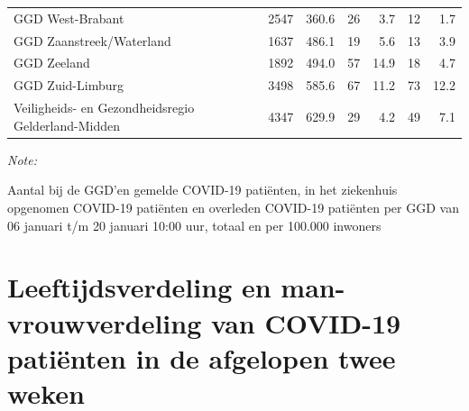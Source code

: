 \documentclass[
  english,
  man,floatsintext]{apa6}
\begin{document}
\begin{table}[H]
\begin{threeparttable}
\begin{tabular}{lrrrrrr}
GGD West-Brabant & 2547 & 360.6 & 26 & 3.7 & 12 & 1.7\\
GGD Zaanstreek/Waterland & 1637 & 486.1 & 19 & 5.6 & 13 & 3.9\\
GGD Zeeland & 1892 & 494.0 & 57 & 14.9 & 18 & 4.7\\
GGD Zuid-Limburg & 3498 & 585.6 & 67 & 11.2 & 73 & 12.2\\
Veiligheids- en Gezondheidsregio Gelderland-Midden & 4347 & 629.9 & 29 & 4.2 & 49 & 7.1\\
\bottomrule
\end{tabular}
\begin{tablenotes}
\item \textit{Note: } 
\item Aantal bij de GGD’en gemelde COVID-19 patiënten, in het ziekenhuis opgenomen COVID-19 patiënten en overleden COVID-19 patiënten per GGD van 06 januari t/m 20 januari 10:00 uur, totaal en per 100.000 inwoners
\end{tablenotes}
\end{threeparttable}
\endgroup{}
\end{table}

\newpage

\hypertarget{leeftijdsverdeling-en-man-vrouwverdeling-van-covid-19-patiuxebnten-in-de-afgelopen-twee-weken}{%
\section{Leeftijdsverdeling en man-vrouwverdeling van COVID-19 patiënten in de afgelopen twee weken}\label{leeftijdsverdeling-en-man-vrouwverdeling-van-covid-19-patiuxebnten-in-de-afgelopen-twee-weken}}
\end{document}
